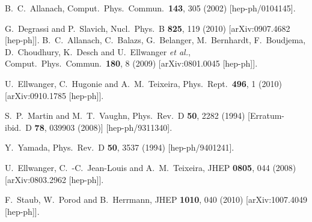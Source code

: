 \documentclass[final,3p,times,pdflatex]{elsarticle}
\begin{document}
\begin{thebibliography}{10}
  B.~C.~Allanach,
  Comput.\ Phys.\ Commun.\  {\bf 143}, 305 (2002)
  [hep-ph/0104145].

  G.~Degrassi and P.~Slavich,
  Nucl.\ Phys.\ B {\bf 825}, 119 (2010)
  [arXiv:0907.4682 [hep-ph]].
  B.~C.~Allanach, C.~Balazs, G.~Belanger, M.~Bernhardt, F.~Boudjema, D.~Choudhury, K.~Desch and U.~Ellwanger {\it et al.},
  Comput.\ Phys.\ Commun.\  {\bf 180}, 8 (2009)
  [arXiv:0801.0045 [hep-ph]].

  U.~Ellwanger, C.~Hugonie and A.~M.~Teixeira,
  Phys.\ Rept.\  {\bf 496}, 1 (2010)
  [arXiv:0910.1785 [hep-ph]].

  S.~P.~Martin and M.~T.~Vaughn,
  Phys.\ Rev.\ D {\bf 50}, 2282 (1994)
  [Erratum-ibid.\ D {\bf 78}, 039903 (2008)]
  [hep-ph/9311340].

  Y.~Yamada,
  Phys.\ Rev.\ D {\bf 50}, 3537 (1994)
  [hep-ph/9401241].

  U.~Ellwanger, C.~-C.~Jean-Louis and A.~M.~Teixeira,
  JHEP {\bf 0805}, 044 (2008)
  [arXiv:0803.2962 [hep-ph]].

  F.~Staub, W.~Porod and B.~Herrmann,
  JHEP {\bf 1010}, 040 (2010)
  [arXiv:1007.4049 [hep-ph]].


\end{thebibliography}
\end{document}
